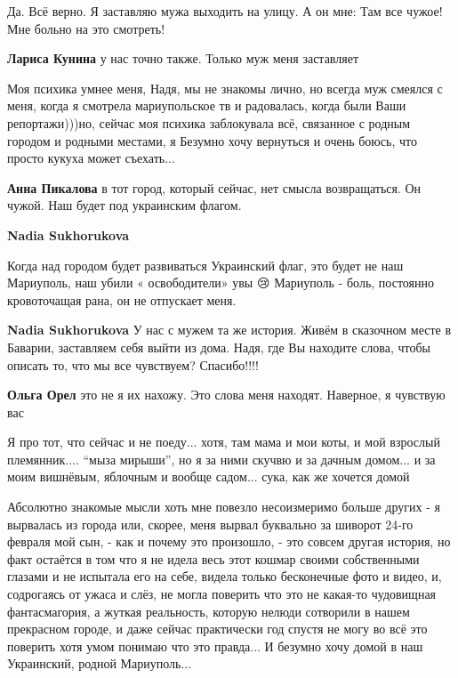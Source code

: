 Да. Всё верно. Я заставляю мужа выходить на улицу. А он мне: Там все чужое! Мне
больно на это смотреть!

\begin{itemize} %
\textbf{Лариса Кунина} у нас точно также. Только муж меня заставляет
\end{itemize} %


Моя психика умнее меня, Надя, мы не знакомы лично, но всегда муж смеялся с
меня, когда я смотрела мариупольское тв и радовалась, когда были Ваши
репортажи)))но, сейчас моя психика заблокувала всё, связанное с родным городом и
родными местами, я Безумно хочу вернуться и очень боюсь, что просто кукуха может
съехать...

\begin{itemize} %
\textbf{Анна Пикалова} в тот город, который сейчас, нет смысла возвращаться. Он чужой. Наш будет под украинским флагом.

\textbf{Nadia Sukhorukova} 

Когда над городом будет развиваться Украинский флаг, это будет не наш
Мариуполь, наш убили « освободители» увы 😢 Мариуполь - боль, постоянно
кровоточащая рана, он не отпускает меня.

\end{itemize} %

\textbf{Nadia Sukhorukova} У нас с мужем та же история. Живём в сказочном месте в Баварии, заставляем себя выйти из дома. Надя, где Вы находите слова, чтобы описать то, что мы все чувствуем? Спасибо!!!!

\begin{itemize} %
\textbf{Ольга Орел} это не я их нахожу. Это слова меня находят. Наверное, я чувствую вас
\end{itemize} %


Я про тот, что сейчас и не поеду... хотя, там мама и мои коты, и мой взрослый
племянник.... \enquote{мыза мирыши}, но я за ними скучвю и за дачным домом... и за моим
вишнёвым, яблочным и вообще садом... сука, как же хочется домой


Абсолютно знакомые мысли хоть мне повезло несоизмеримо больше других - я
вырвалась из города или, скорее, меня вырвал буквально за шиворот 24-го февраля
мой сын, - как и почему это произошло, - это совсем другая история, но факт
остаётся в том что я не идела весь этот кошмар своими собственными глазами и не
испытала его на себе, видела только бесконечные фото и видео, и, содрогаясь от
ужаса и слёз, не могла поверить что это не какая-то чудовищная фантасмагория, а
жуткая реальность, которую нелюди сотворили в нашем прекрасном городе, и даже
сейчас практически год спустя не могу во всё это поверить хотя умом понимаю что
это правда... И безумно хочу домой в наш Украинский, родной Мариуполь...

